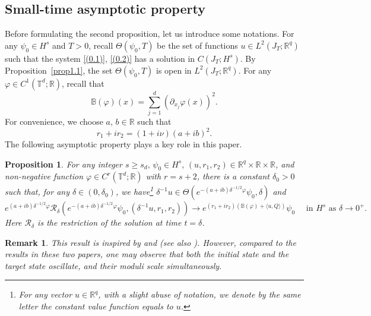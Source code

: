 \documentclass[review]{elsarticle}
\newtheorem{proposition}{Proposition}[section]
\newtheorem{remark}{Remark}[section]
\theoremstyle{dotless}
\def\R {\mathbb{R}}
\def \geq{\geqslant}
\numberwithin{equation}{section}
\begin{document}
\subsection{Small-time asymptotic property}
Before formulating the second proposition, let us introduce some notations. For any $\psi_0 \in H^s$ and $T>0$, recall $\Theta\left(\psi_0, T\right)$ be the set of functions $u \in L^2\left(J_T ; \mathbb{R}^q\right)$ such that the system \eqref{(0.1)}, \eqref{(0.2)} has a solution in $C\left(J_T ; H^s\right)$. By Proposition~\ref{prop1.1}, the set $\Theta\left(\psi_0, T\right)$ is open in $L^2\left(J_T ; \mathbb{R}^q\right)$. For any $\varphi \in C^1\left(\mathbb{T}^d ; \mathbb{R}\right)$, recall that
\begin{equation}\label{(1.2)}
\mathbb{B}(\varphi)(x)=\sum_{j=1}^d\left(\partial_{x_j} \varphi(x)\right)^2 .
\end{equation}
For convenience, we choose $ a,\, b\in\R $ such that $$ r_1+ir_2=(1+i\nu)(a+ib)^2. $$
The following asymptotic property plays a key role in this paper.
\begin{proposition}\label{prop1.2}
For any integer $s \geq s_d,\, \psi_0 \in H^s,\, (u,r_1,r_2) \in \mathbb{R}^q\times\R\times\R$, and  non-negative function $\varphi \in C^r\left(\mathbb{T}^d ; \mathbb{R}\right)$ with $r=s+2$, there is a constant $\delta_0>0$ such that, for any $\delta \in\left(0, \delta_0\right)$, we have\footnote{For any vector $u \in \mathbb{R}^q$, with a slight abuse of notation, we denote by the same letter the constant value function equals to $u$.} $\delta^{-1} u \in \Theta\left(e^{-(a+ib) \delta^{-1 / 2} \varphi} \psi_0, \delta\right)$ and
\begin{equation*}\label{(1.3)}
e^{ (a+ib)\delta^{-1 / 2} \varphi} \mathcal{R}_\delta\left(e^{-(a+ib) \delta^{-1 / 2} \varphi} \psi_0, (\delta^{-1} u,r_1,r_2)\right) \rightarrow e^{(r_1+i r_2)\left( \mathbb{B}(\varphi)+\langle u, Q\rangle\right)} \psi_0 \quad \text { in } H^s \text { as } \delta \rightarrow 0^{+}.
\end{equation*}
Here $\mathcal{R}_\delta$ is the restriction of the solution at time $t=\delta$.
\end{proposition}
\begin{remark}
This result is inspired by \cite[Proposition~1.2]{Duca_EMS} and \cite[Proposition~2.3]{Duca_JMPA} (see also \cite[Proposition~2]{Nersesyan21}). However, compared to the results in these two papers, one may observe that both the initial state and the target state oscillate, and their moduli scale simultaneously.
\end{remark}
\end{document}
